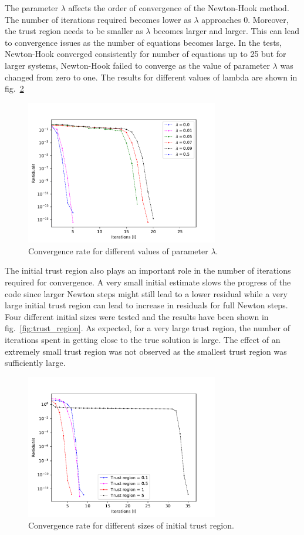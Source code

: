\documentclass[11pt, oneside]{article}
\begin{document}
The parameter $\lambda$ affects the order of convergence of the Newton-Hook method. The number of iterations required becomes lower as $\lambda$ approaches 0. Moreover, the trust region needs to be smaller as $\lambda$ becomes larger and larger. This can lead to convergence issues as the number of equations becomes large. In the tests, Newton-Hook converged consistently for number of equations up to 25 but for larger systems, Newton-Hook failed to converge as the value of parameter $\lambda$ was changed from zero to one. The results for different values of lambda are shown in fig.~\ref{fig:lambda}
\begin{figure}[h!]
  \centering
  \includegraphics[width=0.75\textwidth]{figures/lambda.pdf}
  \caption{Convergence rate for different values of parameter $\lambda$.}
  \label{fig:lambda}
\end{figure}

The initial trust region also plays an important role in the number of iterations required for convergence. A very small initial estimate slows the progress of the code since larger Newton steps might still lead to a lower residual while a very large initial trust region can lead to increase in residuals for full Newton steps. Four different initial sizes were tested and the results have been shown in fig.~\ref{fig:trust_region}. As expected, for a very large trust region, the number of iterations spent in getting close to the true solution is large. The effect of an extremely small trust region was not observed as the smallest trust region was sufficiently large.
\begin{figure}[h!]
  \centering
  \includegraphics[width=0.75\textwidth]{figures/trust_region.pdf}
  \caption{Convergence rate for different sizes of initial trust region.}
  \label{fig:lambda}
\end{figure}
\end{document}
